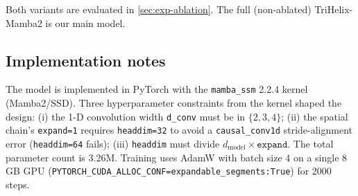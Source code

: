 \noindent Both variants are evaluated in \cref{sec:exp-ablation}. The full
(non-ablated) TriHelix-Mamba2 is our main model.

\subsection{Implementation notes}
\label{sec:impl}

The model is implemented in PyTorch with the \texttt{mamba\_ssm} 2.2.4 kernel
(Mamba2/SSD). Three hyperparameter constraints from the kernel shaped the
design: (i) the 1-D convolution width \texttt{d\_conv} must be in $\{2,3,4\}$;
(ii) the spatial chain's \texttt{expand=1} requires \texttt{headdim=32} to
avoid a \texttt{causal\_conv1d} stride-alignment error
(\texttt{headdim=64} fails); (iii) \texttt{headdim} must divide
$d_{\text{model}}\times\texttt{expand}$. The total parameter count is 3.26M.
Training uses AdamW with batch size 4 on a single 8\,GB GPU
(\texttt{PYTORCH\_CUDA\_ALLOC\_CONF=expandable\_segments:True}) for 2000 steps.
